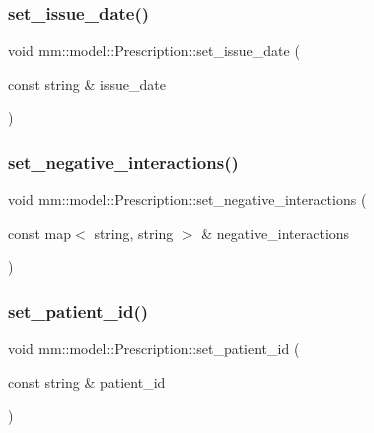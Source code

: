 \subsubsection{\texorpdfstring{set\+\_\+issue\+\_\+date()}{set\_issue\_date()}}
{\footnotesize\ttfamily void mm\+::model\+::\+Prescription\+::set\+\_\+issue\+\_\+date (\begin{DoxyParamCaption}\item[{const string \&}]{issue\+\_\+date }\end{DoxyParamCaption})}

\mbox{\label{classmm_1_1model_1_1_prescription_a90ab6821dda442d202d8dabf50c52cc3}} 
\subsubsection{\texorpdfstring{set\+\_\+negative\+\_\+interactions()}{set\_negative\_interactions()}}
{\footnotesize\ttfamily void mm\+::model\+::\+Prescription\+::set\+\_\+negative\+\_\+interactions (\begin{DoxyParamCaption}\item[{const map$<$ string, string $>$ \&}]{negative\+\_\+interactions }\end{DoxyParamCaption})}

\mbox{\label{classmm_1_1model_1_1_prescription_a7854a3ef7a7fa8e15bc7a5570e1d0946}} 
\subsubsection{\texorpdfstring{set\+\_\+patient\+\_\+id()}{set\_patient\_id()}}
{\footnotesize\ttfamily void mm\+::model\+::\+Prescription\+::set\+\_\+patient\+\_\+id (\begin{DoxyParamCaption}\item[{const string \&}]{patient\+\_\+id }\end{DoxyParamCaption})}

